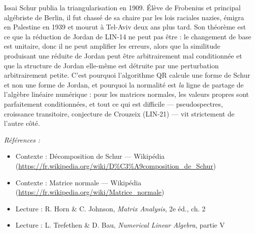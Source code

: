 \documentclass[11pt]{article}
\newenvironment{refs}{\par\small\noindent\emph{Références :}\begin{itemize}\setlength\itemsep{0pt}}{\end{itemize}\normalsize}
\begin{document}
\noindent Issai Schur publia la triangularisation en 1909. Élève de Frobenius et principal
algébriste de Berlin, il fut chassé de sa chaire par les lois raciales nazies, émigra en Palestine en
1939 et mourut à Tel-Aviv deux ans plus tard. Son théorème est ce que la réduction de Jordan de
LIN-14 ne peut pas être : le changement de base est unitaire, donc il ne peut amplifier les erreurs,
alors que la similitude produisant une réduite de Jordan peut être arbitrairement mal conditionnée et
que la structure de Jordan elle-même est détruite par une perturbation arbitrairement petite. C'est
pourquoi l'algorithme QR calcule une forme de Schur et non une forme de Jordan, et pourquoi la
normalité est \textit{la} ligne de partage de l'algèbre linéaire numérique : pour les matrices normales,
les valeurs propres sont parfaitement conditionnées, et tout ce qui est difficile --- pseudospectres,
croissance transitoire, conjecture de Crouzeix (LIN-21) --- vit strictement de l'autre côté.

\begin{refs}
\item Contexte : Décomposition de Schur --- Wikipédia (\url{https://fr.wikipedia.org/wiki/D%C3%A9composition_de_Schur})
\item Contexte : Matrice normale --- Wikipédia (\url{https://fr.wikipedia.org/wiki/Matrice_normale})
\item Lecture : R. Horn \& C. Johnson, \textit{Matrix Analysis}, 2e éd., ch. 2
\item Lecture : L. Trefethen \& D. Bau, \textit{Numerical Linear Algebra}, partie V
\end{refs}

\bigskip
\end{document}

